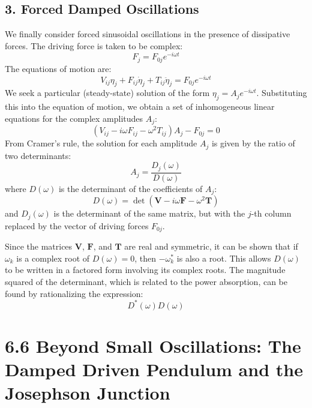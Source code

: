 \documentclass[12pt]{article}
\begin{document}
	\subsection*{3. Forced Damped Oscillations}
	We finally consider forced sinusoidal oscillations in the presence of dissipative forces. The driving force is taken to be complex:
	$$
	F_j = F_{0j} e^{-i\omega t}
	$$
	The equations of motion are:
	$$
	V_{ij}\eta_j + F_{ij}\dot{\eta}_j + T_{ij}\ddot{\eta}_j = F_{0j} e^{-i\omega t}
	$$
	We seek a particular (steady-state) solution of the form $\eta_j = A_j e^{-i\omega t}$. Substituting this into the equation of motion, we obtain a set of inhomogeneous linear equations for the complex amplitudes $A_j$:
	$$
	(V_{ij} - i\omega F_{ij} - \omega^2 T_{ij}) A_j - F_{0j} = 0
	$$
	From Cramer's rule, the solution for each amplitude $A_j$ is given by the ratio of two determinants:
	$$
	A_j = \frac{D_j(\omega)}{D(\omega)}
	$$
	where $D(\omega)$ is the determinant of the coefficients of $A_j$:
	$$
	D(\omega) = \det(\mathbf{V} - i\omega \mathbf{F} - \omega^2 \mathbf{T})
	$$
	and $D_j(\omega)$ is the determinant of the same matrix, but with the $j$-th column replaced by the vector of driving forces $F_{0j}$.
	
	Since the matrices $\mathbf{V}$, $\mathbf{F}$, and $\mathbf{T}$ are real and symmetric, it can be shown that if $\omega_k$ is a complex root of $D(\omega) = 0$, then $-\omega_k^*$ is also a root. This allows $D(\omega)$ to be written in a factored form involving its complex roots. The magnitude squared of the determinant, which is related to the power absorption, can be found by rationalizing the expression:
	$$
	D^*(\omega) D(\omega)
	$$
	
	\section*{6.6 Beyond Small Oscillations: The Damped Driven Pendulum and the Josephson Junction}
\end{document}
